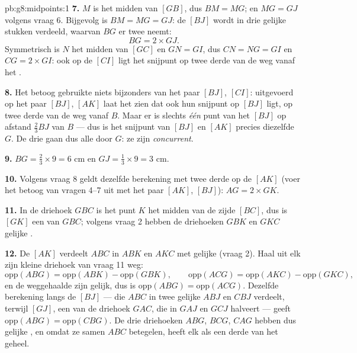 \begin{solution}{pb:g8:midpoints:1}
\textbf{7.} $M$ is het midden van $[GB]$, dus $BM = MG$; en $MG = GJ$ volgens
vraag 6. Bijgevolg is $BM = MG = GJ$: de  $[BJ]$ wordt in drie gelijke
stukken verdeeld, waarvan $BG$ er twee neemt:
\[
BG = 2 \times GJ .
\]
Symmetrisch is $N$ het midden van $[GC]$ en $GN = GI$, dus $CN = NG = GI$ en
$CG = 2 \times GI$: ook op de  $[CI]$ ligt het snijpunt op twee derde
van de weg vanaf het .

\textbf{8.} Het betoog gebruikte niets bijzonders van het paar $[BJ]$, $[CI]$:
uitgevoerd op het paar $[BJ]$, $[AK]$ laat het zien dat ook hun snijpunt op
$[BJ]$ ligt, op twee derde van de weg vanaf $B$. Maar er is slechts \emph{één}
punt van het  $[BJ]$ op afstand $\frac23 BJ$ van $B$ --- dus is het
snijpunt van $[BJ]$ en $[AK]$ precies diezelfde $G$. De drie  gaan
dus alle door $G$: ze zijn \emph{concurrent}.

\textbf{9.} $BG = \frac23 \times 9 = 6$ cm en $GJ = \frac13 \times 9 = 3$ cm.

\textbf{10.} Volgens vraag 8 geldt dezelfde berekening met twee derde op de
 $[AK]$ (voer het betoog van vragen 4--7 uit met het paar $[AK]$,
$[BJ]$): $AG = 2 \times GK$.

\textbf{11.} In de driehoek $GBC$ is het punt $K$ het midden van de zijde $[BC]$,
dus is $[GK]$ een  van $GBC$; volgens vraag 2 hebben de driehoeken
$GBK$ en $GKC$ gelijke .

\textbf{12.} De  $[AK]$ verdeelt $ABC$ in $ABK$ en $AKC$ met gelijke
 (vraag 2). Haal uit elk zijn kleine driehoek van vraag 11 weg:
\[
\text{opp}(ABG) = \text{opp}(ABK) - \text{opp}(GBK),
\qquad
\text{opp}(ACG) = \text{opp}(AKC) - \text{opp}(GKC),
\]
en de weggehaalde  zijn gelijk, dus is
$\text{opp}(ABG) = \text{opp}(ACG)$. Dezelfde berekening langs de 
$[BJ]$ --- die $ABC$ in twee gelijke  $ABJ$ en $CBJ$ verdeelt, terwijl
$[GJ]$, een  van de driehoek $GAC$, die in $GAJ$ en $GCJ$ halveert ---
geeft $\text{opp}(ABG) = \text{opp}(CBG)$. De drie driehoeken $ABG$, $BCG$, $CAG$
hebben dus gelijke , en omdat ze samen $ABC$ betegelen, heeft elk als
 een derde van het geheel.


\end{solution}
